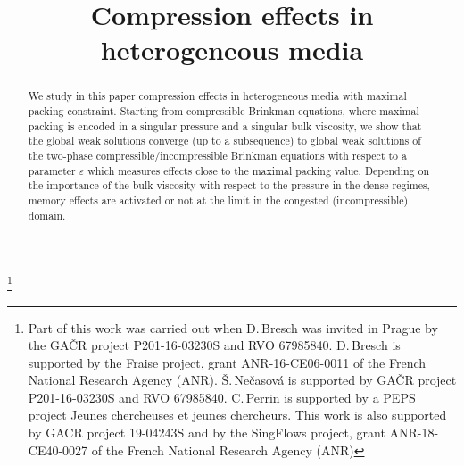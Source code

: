 \documentclass[JEP,XML,SOM,Unicode,NoEqCountersInSection]{cedram}
\newcommand{\<}{\bigl\langle}
\renewcommand{\>}{\bigr\rangle}
\theoremstyle{definition}
\theoremstyle{remark}
\begin{document}
\title{Compression effects in heterogeneous media}

\author[\initial{D.} \lastname{Bresch}]{ }
\address{LAMA UMR 5127 CNRS, Univ. Savoie Mont Blanc\\
Chambéry, France}

\author[\initial{S.} \lastname{Ne\v casová}]{ }
\address{Institute of Mathematics, Academy of Sciences of the Czech Republic\\
Žitná 25,
CZ-115 67 Praha 1,
Czech Republic }

\author[\initial{C.} \lastname{Perrin}]{ }
\address{Aix Marseille Univ., CNRS, Centrale Marseille, I2M\\ Marseille, France}

\thanks{Part of this work was carried out when D.\,Bresch was invited in Prague by the GA\v CR project P201-16-03230S and RVO 67985840.
D.\,Bresch is supported by the Fraise project, grant ANR-16-CE06-0011 of the French National Research Agency (ANR).
\v S.\,Ne\v casová is supported by GA\v CR project P201-16-03230S and RVO 67985840.
C.\,Perrin is supported by a PEPS project \og Jeunes chercheuses et jeunes chercheurs\fg.
This work is also supported by GACR project 19-04243S and by the SingFlows project, grant ANR-18-CE40-0027 of the French National Research Agency (ANR)}

\begin{abstract}
We study in this paper compression effects in heterogeneous media with maximal packing constraint. Starting from compressible Brinkman equations, where maximal packing is encoded in a singular pressure and a singular bulk viscosity, we show that the global weak solutions converge (up to a subsequence) to global weak solutions of the two-phase compressible/incompressible Brinkman equations with respect to a parameter $\varepsilon$ which measures effects close to the maximal packing value. Depending on the importance of the bulk viscosity with respect to the pressure in the dense regimes, memory effects are activated or not at the limit in the congested (incompressible) domain.
\end{abstract}

\end{document}
